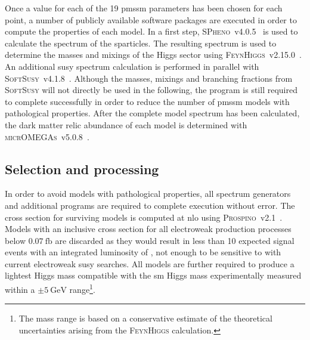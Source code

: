 Once a value for each of the 19 \gls{pmssm} parameters has been chosen for each point, a number of publicly available software packages are executed in order to compute the properties of each model.
In a first step, \textsc{SPheno}~v4.0.5~\cite{spheno_1:2003um,spheno_2:2011nf} is used to calculate the spectrum of the sparticles. The resulting spectrum is used to determine the masses and mixings of the Higgs sector using \textsc{FeynHiggs}~v2.15.0~\cite{FeynHiggs:1998yj,FeynHiggs_1:2018qog,FeynHiggs_2:2013ria}.
An additional \gls{susy} spectrum calculation is performed in parallel with \textsc{SoftSusy}~v4.1.8~\cite{softsusy:2001kg}.
Although the masses, mixings and branching fractions from \textsc{SoftSusy} will not directly be used in the following, the program is still required to complete successfully in order to reduce the number of \gls{pmssm} models with pathological properties.
After the complete model spectrum has been calculated, the dark matter relic abundance of each model is determined with \textsc{micrOMEGAs}~v5.0.8~\cite{micromegas_1:2006is,micromegas_2:2010pz}.


\subsection{Selection and processing}

In order to avoid models with pathological properties, all spectrum generators and additional programs are required to complete execution without error. The cross section for surviving models is computed at \gls{nlo} using \textsc{Prospino}~v2.1~\cite{prospino:314229, prospino_2:1999xh}. Models with an inclusive cross section for all electroweak production processes below $\SI{0.07}{\femto\barn}$ are discarded as they would result in less than 10 expected signal events with an integrated luminosity of \onethirtynineifb, not enough to be sensitive to with current electroweak \gls{susy} searches. 
All models are further required to produce a lightest Higgs mass compatible with the \gls{sm} Higgs mass experimentally measured within a $\pm\SI{5}{\GeV}$ range\footnote{The mass range is based on a conservative estimate of the theoretical uncertainties arising from the \textsc{FeynHiggs} calculation.}.

